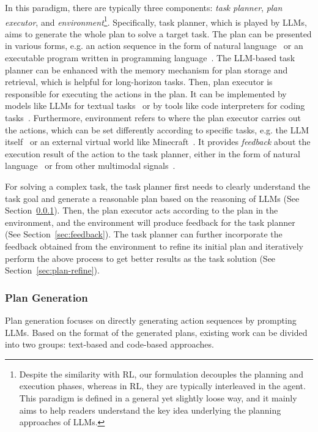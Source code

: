 {{{{{In this paradigm, there are typically three components: \emph{task planner}, \emph{plan executor}, and \emph{environment}\footnote{
Despite the similarity with RL, our formulation decouples the planning and execution phases, whereas in RL, they are typically interleaved in the agent. This paradigm is defined in a general yet slightly loose way, and it mainly aims to help readers understand the key idea underlying the planning approaches of LLMs. }. Specifically, task planner, which is played by LLMs, aims to generate the whole plan to solve a target task. The plan can be presented in various forms, e.g. an action sequence in the form of natural language~\cite{Zhou-arxiv-2022-Least} or an executable program written in programming language~\cite{Gao-arxiv-2022-PAL}. The LLM-based task planner can be enhanced with the memory mechanism for plan storage and retrieval, which is helpful for long-horizon tasks. Then, plan executor is responsible for executing the actions in the plan. It can be implemented by models like LLMs for textual tasks~\cite{Wang-arXiv-2023-Plan} or by tools like code interpreters for coding tasks~\cite{Shinn-2023-arXiv-Reflexion}. Furthermore, environment refers to where the plan executor carries out the actions, which can be set differently according to specific tasks, e.g. the LLM itself~\cite{Yao-2023-arXiv-tree} or an external virtual world like Minecraft~\cite{Wang-2023-arXiv-voyager}. It provides \textit{feedback} about the execution result of the action to the task planner, either in the form of natural language~\cite{Shinn-2023-arXiv-Reflexion} or from other multimodal signals~\cite{Lu-2023-arXiv-multimodal}.

For solving a complex task, the task planner first needs to clearly understand the task goal and generate a reasonable plan based on the reasoning of LLMs (See Section~\ref{sec:plan-gen}).
Then, the plan executor acts according to the plan in the environment, and the environment will produce feedback for the task planner (See Section~\ref{sec:feedback}).
The task planner can further incorporate the feedback obtained from the environment to refine its initial plan and iteratively perform the above process to get better results as the task solution (See Section~\ref{sec:plan-refine}).

\subsubsection{Plan Generation}
\label{sec:plan-gen}
Plan generation focuses on directly generating action sequences by prompting LLMs. Based on the format of the generated plans, existing work can be divided into two groups: text-based and code-based approaches. 

}}}}}
